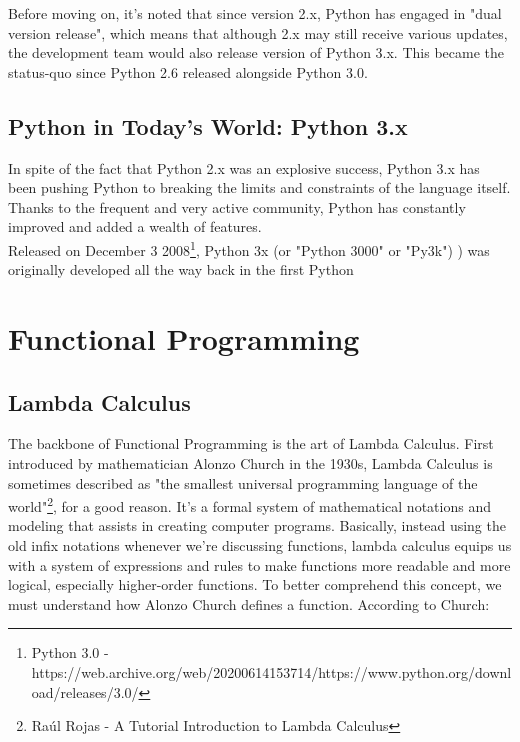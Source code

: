 \documentclass[twoside,final]{hcmut-report}
\begin{document}
Before moving on, it's noted that since version 2.x, Python has engaged in "dual version release", which means that although 2.x may still receive various updates, the development team would also release version of Python 3.x. This became the status-quo since Python 2.6 released alongside Python 3.0. 


\subsection{Python in Today's World: Python 3.x}
In spite of the fact that Python 2.x was an explosive success, Python 3.x has been pushing Python to breaking the limits and constraints of the language itself. Thanks to the frequent and very active community, Python has constantly improved and added a wealth of features. \\
\hspace*{3mm} Released on December 3 2008\footnote{Python 3.0 - https://web.archive.org/web/20200614153714/https://www.python.org/download/releases/3.0/}, Python 3x (or "Python 3000" or "Py3k") ) was originally developed all the way back in the first Python 
\pagebreak

\section{Functional Programming}

\subsection{Lambda Calculus}

\hspace*{3mm} The backbone of Functional Programming is the art of Lambda Calculus. 	First introduced by mathematician Alonzo Church in the 1930s, Lambda Calculus is sometimes described as "the smallest universal programming language of the world"\footnote{Raúl Rojas - A Tutorial Introduction to Lambda Calculus}, for a good reason. It's a formal system of mathematical notations and modeling that assists in creating computer programs. Basically, instead using the old infix notations whenever we're discussing functions, lambda calculus equips us with a system of expressions and rules to make functions more readable and more logical, especially higher-order functions. To better comprehend this concept, we must understand how Alonzo Church defines a function. According to Church:
\end{document}
